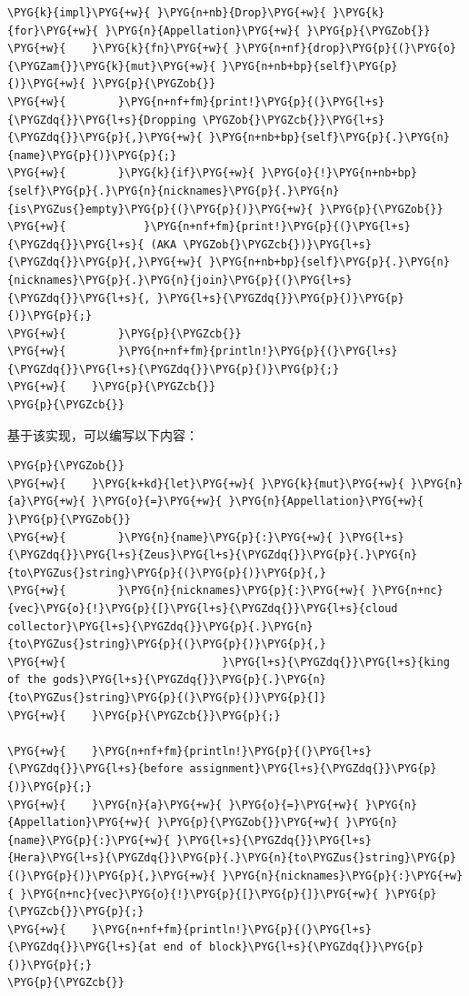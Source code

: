 \begin{Verbatim}[commandchars=\\\{\},breaklines=true,breakanywhere=true,fontsize=\codefont,xleftmargin=17bp]
\PYG{k}{impl}\PYG{+w}{ }\PYG{n+nb}{Drop}\PYG{+w}{ }\PYG{k}{for}\PYG{+w}{ }\PYG{n}{Appellation}\PYG{+w}{ }\PYG{p}{\PYGZob{}}
\PYG{+w}{    }\PYG{k}{fn}\PYG{+w}{ }\PYG{n+nf}{drop}\PYG{p}{(}\PYG{o}{\PYGZam{}}\PYG{k}{mut}\PYG{+w}{ }\PYG{n+nb+bp}{self}\PYG{p}{)}\PYG{+w}{ }\PYG{p}{\PYGZob{}}
\PYG{+w}{        }\PYG{n+nf+fm}{print!}\PYG{p}{(}\PYG{l+s}{\PYGZdq{}}\PYG{l+s}{Dropping \PYGZob{}\PYGZcb{}}\PYG{l+s}{\PYGZdq{}}\PYG{p}{,}\PYG{+w}{ }\PYG{n+nb+bp}{self}\PYG{p}{.}\PYG{n}{name}\PYG{p}{)}\PYG{p}{;}
\PYG{+w}{        }\PYG{k}{if}\PYG{+w}{ }\PYG{o}{!}\PYG{n+nb+bp}{self}\PYG{p}{.}\PYG{n}{nicknames}\PYG{p}{.}\PYG{n}{is\PYGZus{}empty}\PYG{p}{(}\PYG{p}{)}\PYG{+w}{ }\PYG{p}{\PYGZob{}}
\PYG{+w}{            }\PYG{n+nf+fm}{print!}\PYG{p}{(}\PYG{l+s}{\PYGZdq{}}\PYG{l+s}{ (AKA \PYGZob{}\PYGZcb{})}\PYG{l+s}{\PYGZdq{}}\PYG{p}{,}\PYG{+w}{ }\PYG{n+nb+bp}{self}\PYG{p}{.}\PYG{n}{nicknames}\PYG{p}{.}\PYG{n}{join}\PYG{p}{(}\PYG{l+s}{\PYGZdq{}}\PYG{l+s}{, }\PYG{l+s}{\PYGZdq{}}\PYG{p}{)}\PYG{p}{)}\PYG{p}{;}
\PYG{+w}{        }\PYG{p}{\PYGZcb{}}
\PYG{+w}{        }\PYG{n+nf+fm}{println!}\PYG{p}{(}\PYG{l+s}{\PYGZdq{}}\PYG{l+s}{\PYGZdq{}}\PYG{p}{)}\PYG{p}{;}
\PYG{+w}{    }\PYG{p}{\PYGZcb{}}
\PYG{p}{\PYGZcb{}}
\end{Verbatim}

基于该实现，可以编写以下内容：

\begin{Verbatim}[commandchars=\\\{\},breaklines=true,breakanywhere=true,fontsize=\codefont,xleftmargin=17bp]
\PYG{p}{\PYGZob{}}
\PYG{+w}{    }\PYG{k+kd}{let}\PYG{+w}{ }\PYG{k}{mut}\PYG{+w}{ }\PYG{n}{a}\PYG{+w}{ }\PYG{o}{=}\PYG{+w}{ }\PYG{n}{Appellation}\PYG{+w}{ }\PYG{p}{\PYGZob{}}
\PYG{+w}{        }\PYG{n}{name}\PYG{p}{:}\PYG{+w}{ }\PYG{l+s}{\PYGZdq{}}\PYG{l+s}{Zeus}\PYG{l+s}{\PYGZdq{}}\PYG{p}{.}\PYG{n}{to\PYGZus{}string}\PYG{p}{(}\PYG{p}{)}\PYG{p}{,}
\PYG{+w}{        }\PYG{n}{nicknames}\PYG{p}{:}\PYG{+w}{ }\PYG{n+nc}{vec}\PYG{o}{!}\PYG{p}{[}\PYG{l+s}{\PYGZdq{}}\PYG{l+s}{cloud collector}\PYG{l+s}{\PYGZdq{}}\PYG{p}{.}\PYG{n}{to\PYGZus{}string}\PYG{p}{(}\PYG{p}{)}\PYG{p}{,}
\PYG{+w}{                        }\PYG{l+s}{\PYGZdq{}}\PYG{l+s}{king of the gods}\PYG{l+s}{\PYGZdq{}}\PYG{p}{.}\PYG{n}{to\PYGZus{}string}\PYG{p}{(}\PYG{p}{)}\PYG{p}{]}
\PYG{+w}{    }\PYG{p}{\PYGZcb{}}\PYG{p}{;}

\PYG{+w}{    }\PYG{n+nf+fm}{println!}\PYG{p}{(}\PYG{l+s}{\PYGZdq{}}\PYG{l+s}{before assignment}\PYG{l+s}{\PYGZdq{}}\PYG{p}{)}\PYG{p}{;}
\PYG{+w}{    }\PYG{n}{a}\PYG{+w}{ }\PYG{o}{=}\PYG{+w}{ }\PYG{n}{Appellation}\PYG{+w}{ }\PYG{p}{\PYGZob{}}\PYG{+w}{ }\PYG{n}{name}\PYG{p}{:}\PYG{+w}{ }\PYG{l+s}{\PYGZdq{}}\PYG{l+s}{Hera}\PYG{l+s}{\PYGZdq{}}\PYG{p}{.}\PYG{n}{to\PYGZus{}string}\PYG{p}{(}\PYG{p}{)}\PYG{p}{,}\PYG{+w}{ }\PYG{n}{nicknames}\PYG{p}{:}\PYG{+w}{ }\PYG{n+nc}{vec}\PYG{o}{!}\PYG{p}{[}\PYG{p}{]}\PYG{+w}{ }\PYG{p}{\PYGZcb{}}\PYG{p}{;}
\PYG{+w}{    }\PYG{n+nf+fm}{println!}\PYG{p}{(}\PYG{l+s}{\PYGZdq{}}\PYG{l+s}{at end of block}\PYG{l+s}{\PYGZdq{}}\PYG{p}{)}\PYG{p}{;}
\PYG{p}{\PYGZcb{}}
\end{Verbatim}

